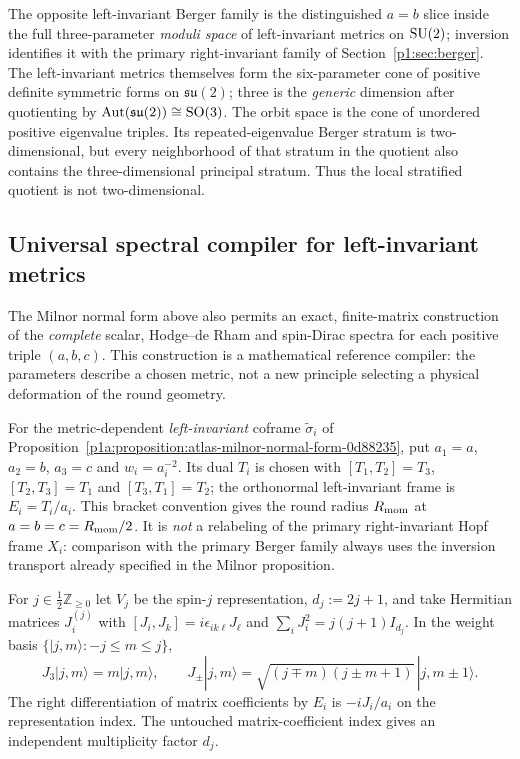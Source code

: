\documentclass[11pt]{article}
\begin{document}
\begin{remark}
The opposite left-invariant Berger family is the distinguished \(a=b\)
slice inside the full three-parameter \emph{moduli space} of left-invariant
metrics on \(\mathrm{SU}(2)\); inversion identifies it with the primary
right-invariant family of Section~\ref{p1:sec:berger}.
The left-invariant metrics themselves form the six-parameter cone of positive
definite symmetric forms on \(\mathfrak{su}(2)\); three is the \emph{generic}
dimension after quotienting by \(\operatorname{Aut}(\mathfrak{su}(2))\cong\mathrm{SO}(3)\).  The
orbit space is the cone of unordered positive eigenvalue triples.  Its
repeated-eigenvalue Berger stratum is two-dimensional, but every neighborhood
of that stratum in the quotient also contains the three-dimensional principal
stratum.  Thus the local stratified quotient is not two-dimensional.
\end{remark}

\subsection{Universal spectral compiler for left-invariant metrics}
\label{p1:subsec:general-left-invariant-spectral-compiler}

The Milnor normal form above also permits an exact, finite-matrix construction
of the \emph{complete} scalar, Hodge--de Rham and spin-Dirac spectra for each
positive triple $(a,b,c)$.  This construction is a mathematical reference
compiler: the parameters describe a chosen metric, not a new principle
selecting a physical deformation of the round geometry.

\begin{definition}
\label{p1:def:general-spectral-frame}
For the metric-dependent \emph{left-invariant} coframe
$\tilde\sigma_i$ of Proposition~\ref{p1a:proposition:atlas-milnor-normal-form-0d88235},
put $a_1=a$, $a_2=b$, $a_3=c$ and $w_i=a_i^{-2}$.  Its dual
$T_i$ is chosen with $[T_1,T_2]=T_3$, $[T_2,T_3]=T_1$ and
$[T_3,T_1]=T_2$; the orthonormal left-invariant frame is $E_i=T_i/a_i$.
This bracket convention gives the round radius $R_{\mathrm{mom}}$ at
$a=b=c=R_{\mathrm{mom}}/2$.  It is \emph{not} a relabeling of the primary
right-invariant Hopf frame $X_i$: comparison with the primary Berger
family always uses the inversion transport already specified in the
Milnor proposition.

For $j\in\frac12\mathbb Z_{\ge0}$ let $V_j$ be the spin-$j$
representation, $d_j:=2j+1$, and take Hermitian matrices
$J_i^{(j)}$ with $[J_i,J_k]=i\epsilon_{ik\ell}J_\ell$ and
$\sum_iJ_i^2=j(j+1)I_{d_j}$.  In the weight basis
$\{|j,m\rangle:-j\le m\le j\}$,
\[
  J_3|j,m\rangle=m|j,m\rangle,\qquad
  J_\pm|j,m\rangle
   =\sqrt{(j\mp m)(j\pm m+1)}\,|j,m\pm1\rangle.
\]
The right differentiation of matrix coefficients by $E_i$ is
$-iJ_i/a_i$ on the representation index.  The untouched matrix-coefficient
index gives an independent multiplicity factor $d_j$.
\end{definition}
\end{document}
